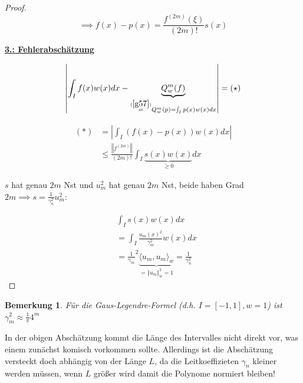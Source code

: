 \documentclass{book}
\newtheorem{remark}[algorithm]{Bemerkung}
\begin{document}
\begin{proof}
                \begin{equation}\label{g58}
                    \implies f(x)-p(x)=\frac{f^(2m)(\xi)}{(2m)!}s(x)
                \end{equation}

                \underline{\textbf{3.: Fehlerabschätzung}}

                \begin{equation*}
                    \left\vert \int_I f(x)w(x)dx-\underbrace{Q_w^m(f)}_{\stackrel{(\ref{g57})}{=}Q_w^m(p)=\int_I p(x)w(x)dx} \right\vert = (\star)
                \end{equation*}

                \begin{align*}
                    (*) &= \left\vert \int_I (f(x)-p(x))w(x)dx \right\vert \\
                    &\leq \frac{\left\Vert f^{(2m)} \right\Vert}{(2m)!} \int_I \underbrace{s(x)w(x)}_{\geq 0}dx
                \end{align*}

                $s$ hat genau $2m$ Nst und $u_m^2$ hat genau $2m$ Nst, beide haben Grad $2m\implies s=\frac{1}{\gamma_n^2}u_m^2$:

                \begin{align*}
                    &\int_I s(x)w(x)dx\\
                    &=\int_I\frac{u_m(x)^2}{\gamma_m^2} w(x)dx\\
                    &=\frac{1}{\gamma_m}^2 \underbrace{\langle u_m,u_m \rangle_w}_{=\left\Vert u_m \right\Vert_w^2=1}=\frac{1}{\gamma_n^2}
                \end{align*}

            \end{proof}

            \begin{remark}\label{b512}
                Für die Gaus-Legendre-Formel (d.h. $I=[-1,1],w=1$) ist $\gamma_m^2 \approx \frac{1}{\pi}4^m$
            \end{remark}

            \begin{tcolorbox}[enhanced,breakable,
            title=Unabhängig von der Länge von $I$?]
            In der obigen Abschätzung kommt die Länge des Intervalles nicht direkt vor, was einem zunächst komisch vorkommen sollte. 
            Allerdings ist die Abschätzung versteckt doch abhängig von der Länge $L$, da die Leitkoeffizieten $\gamma_n$ kleiner werden müssen, wenn $L$ größer wird damit die Polynome normiert bleiben!
            \end{tcolorbox}
            
\end{document}
